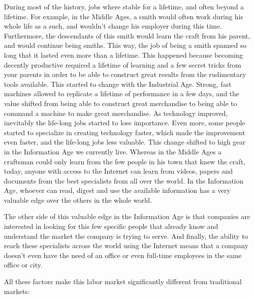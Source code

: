 \documentclass{article}
\begin{document}
During most of the history, jobs where stable for a lifetime, and often beyond a lifetime. For example, in the Middle Ages, a smith would often work during his whole life as a such, and wouldn't change his employer during this time. Furthermore, the descendants of this smith would learn the craft from his parent, and would continue being smiths. This way, the job of being a smith spanned so long that it lasted even more than a lifetime. This happened because becoming decently productive required a lifetime of learning and a few secret tricks from your parents in order to be able to construct great results from the rudimentary tools available. This started to change with the Industrial Age. Strong, fast machines allowed to replicate a lifetime of performance in a few days, and the value shifted from being able to construct great merchandise to being able to command a machine to make great merchandise. As technology improved, inevitably the life-long jobs started to lose importance. Even more, some people started to specialize in creating technology faster, which made the improvement even faster, and the life-long jobs less valuable. This change shifted to high gear in the Information Age we currently live. Whereas in the Middle Ages a craftsman could only learn from the few people in his town that knew the craft, today, anyone with access to the Internet can learn from videos, papers and documents from the best specialists from all over the world. In the Information Age, whoever can read, digest and use the available information has a very valuable edge over the others in the whole world.

The other side of this valuable edge in the Information Age is that companies are interested in looking for this few specific people that already know and understand the market the company is trying to serve. And finally, the ability to reach these specialists across the world using the Internet means that a company doesn't even have the need of an office or even full-time employees in the same office or city.

All these factors make this labor market significantly different from traditional markets:
\end{document}
